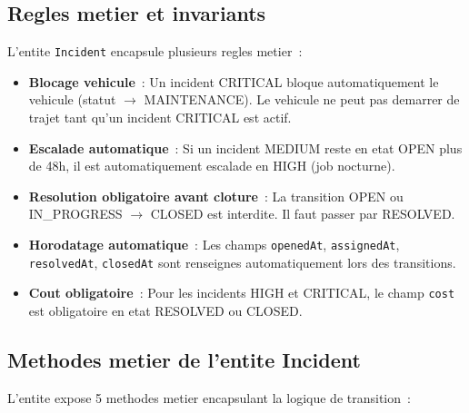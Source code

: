 \documentclass[12pt,a4paper]{report}
\begin{document}
\subsection{Regles metier et invariants}

L'entite \texttt{Incident} encapsule plusieurs regles metier~:

\begin{itemize}[leftmargin=2cm]
  \item \textbf{Blocage vehicule}~: Un incident CRITICAL bloque automatiquement
        le vehicule (statut $\to$ MAINTENANCE). Le vehicule ne peut pas
        demarrer de trajet tant qu'un incident CRITICAL est actif.
        
  \item \textbf{Escalade automatique}~: Si un incident MEDIUM reste en
        etat OPEN plus de 48h, il est automatiquement escalade en HIGH
        (job nocturne).
        
  \item \textbf{Resolution obligatoire avant cloture}~: La transition
        OPEN ou IN\_PROGRESS $\to$ CLOSED est interdite. Il faut passer
        par RESOLVED.
        
  \item \textbf{Horodatage automatique}~: Les champs \texttt{openedAt},
        \texttt{assignedAt}, \texttt{resolvedAt}, \texttt{closedAt} sont
        renseignes automatiquement lors des transitions.
        
  \item \textbf{Cout obligatoire}~: Pour les incidents HIGH et CRITICAL,
        le champ \texttt{cost} est obligatoire en etat RESOLVED ou CLOSED.
\end{itemize}

\subsection{Methodes metier de l'entite Incident}

L'entite expose 5 methodes metier encapsulant la logique de transition~:
\end{document}
